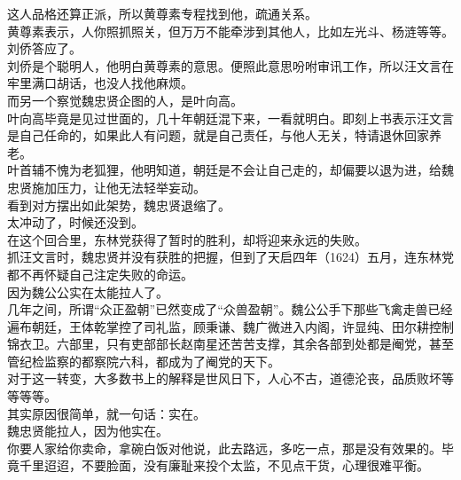 \begin{multicols}{\theparacolNo}
这人品格还算正派，所以黄尊素专程找到他，疏通关系。\\

黄尊素表示，人你照抓照关，但万万不能牵涉到其他人，比如左光斗、杨涟等等。\\

刘侨答应了。\\

刘侨是个聪明人，他明白黄尊素的意思。便照此意思吩咐审讯工作，所以汪文言在牢里满口胡话，也没人找他麻烦。\\

而另一个察觉魏忠贤企图的人，是叶向高。\\

叶向高毕竟是见过世面的，几十年朝廷混下来，一看就明白。即刻上书表示汪文言是自己任命的，如果此人有问题，就是自己责任，与他人无关，特请退休回家养老。\\

叶首辅不愧为老狐狸，他明知道，朝廷是不会让自己走的，却偏要以退为进，给魏忠贤施加压力，让他无法轻举妄动。\\

看到对方摆出如此架势，魏忠贤退缩了。\\

太冲动了，时候还没到。\\

在这个回合里，东林党获得了暂时的胜利，却将迎来永远的失败。\\

抓汪文言时，魏忠贤并没有获胜的把握，但到了天启四年（1624）五月，连东林党都不再怀疑自己注定失败的命运。\\

因为魏公公实在太能拉人了。\\

几年之间，所谓“众正盈朝”已然变成了“众兽盈朝”。魏公公手下那些飞禽走兽已经遍布朝廷，王体乾掌控了司礼监，顾秉谦、魏广微进入内阁，许显纯、田尔耕控制锦衣卫。六部里，只有吏部部长赵南星还苦苦支撑，其余各部到处都是阉党，甚至管纪检监察的都察院六科，都成为了阉党的天下。\\

对于这一转变，大多数书上的解释是世风日下，人心不古，道德沦丧，品质败坏等等等等。\\

其实原因很简单，就一句话：实在。\\

魏忠贤能拉人，因为他实在。\\

你要人家给你卖命，拿碗白饭对他说，此去路远，多吃一点，那是没有效果的。毕竟千里迢迢，不要脸面，没有廉耻来投个太监，不见点干货，心理很难平衡。\\


\end{multicols}
